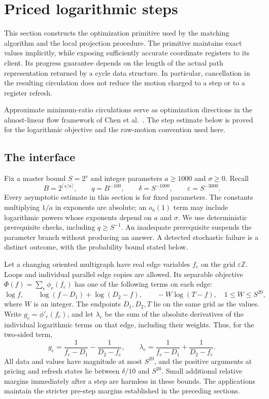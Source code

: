 \section{Priced logarithmic steps}\label{sec:engine}

This section constructs the optimization primitive used by the matching
algorithm and the local projection procedure.  The primitive maintains
exact values implicitly, while exposing sufficiently accurate coordinate
registers to its client.  Its progress guarantee depends on the length of
the actual path representation returned by a cycle data structure.  In
particular, cancellation in the resulting circulation does not reduce the
motion charged to a step or to a register refresh.

Approximate minimum-ratio circulations serve as optimization directions
in the almost-linear flow framework of Chen et al.~\cite{FlowRandomized}.
The step estimate below is proved for the logarithmic objective and the
raw-motion convention used here.

\subsection{The interface}\label{engine:interface}

Fix a master bound $S=2^s$ and integer parameters $a\ge1000$ and
$\sigma\ge0$.  Recall
\begin{equation}\label{engine:parameters}
 B=2^{\lceil s/a\rceil},\qquad q=B^{-100},\qquad
 \delta=S^{-1000},\qquad \varepsilon=S^{-3000}.
\end{equation}
Every asymptotic estimate in this section is for fixed parameters.  The
constants multiplying $1/a$ in exponents are absolute; an $o_a(1)$ term
may include logarithmic powers whose exponents depend on $a$ and
$\sigma$.  We use deterministic prerequisite checks, including
$q\ge S^{-1}$.  An inadequate prerequisite suspends the parameter branch
without producing an answer.  A detected stochastic failure is a distinct
outcome, with the probability bound stated below.

Let a changing oriented multigraph have real edge variables $f_e$ on the
grid $\varepsilon\mathbb Z$.  Loops and individual parallel edge copies
are allowed.  Its separable objective $\Phi(f)=\sum_e\phi_e(f_e)$ has one
of the following terms on each edge:
\begin{equation}\label{engine:objectives}
 \log f,\qquad
 \log(f-D_1)+\log(D_2-f),\qquad
 -W\log(T-f),\quad 1\le W\le S^{20},
\end{equation}
where $W$ is an integer.  The endpoints $D_1,D_2,T$ lie on the same grid
as the values.  Write $g_e=\phi'_e(f_e)$, and let $\lambda_e$ be the sum
of the absolute derivatives of the individual logarithmic terms on that
edge, including their weights.  Thus, for the two-sided term,
\[
 g_e=\frac1{f_e-D_1}-\frac1{D_2-f_e},\qquad
 \lambda_e=\frac1{f_e-D_1}+\frac1{D_2-f_e}.
\]
All data and values have magnitude at most $S^{20}$, and the positive
arguments at pricing and refresh states lie between $\delta/10$ and
$S^{20}$.  Small additional relative margins immediately after a step
are harmless in these bounds.  The applications maintain the stricter
pre-step margins established in the preceding sections.

